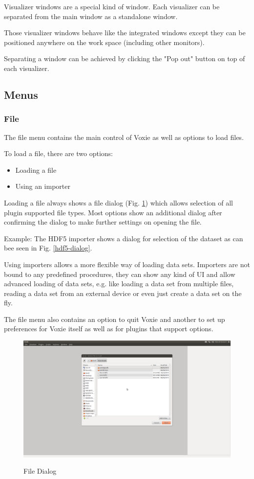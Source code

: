 Visualizer windows are a special kind of window.
Each visualizer can be separated from the main window
as a standalone window.

Those visualizer windows behave like the integrated windows
except they can be positioned anywhere on the work space
(including other monitors).

Separating a window can be achieved by clicking the "Pop out" button
on top of each visualizer.

\subsection{Menus}
\label{menus}

\subsubsection{File}

The file menu contains the main control of Voxie as well as options to load
files.

To load a file, there are two options:
\begin{itemize}
	\item{Loading a file}
	\item{Using an importer}
\end{itemize}
Loading a file always shows a file dialog (Fig. \ref{file-dialog}) which allows selection of
all plugin supported file types. Most options show an additional dialog after
confirming the dialog to make further settings on opening the file.

Example:\newline
The HDF5 importer shows a dialog for selection of the dataset as can bee
seen in Fig. \ref{hdf5-dialog}.

Using importers allows a more flexible way of loading data sets.
Importers are not bound to any predefined procedures, they can show any
kind of UI and allow advanced loading of data sets, e.g. like loading a data
set from multiple files, reading a data set from an external device or 
even just create a data set on the fly.

The file menu also contains an option to quit Voxie and another to set up
preferences for Voxie itself as well as for plugins that support options.

\begin{figure}[h]
	\caption{File Dialog}
	\centering
	\includegraphics[width=1.0\textwidth]{img/file-dialog.png}
	\label{file-dialog}
\end{figure}

